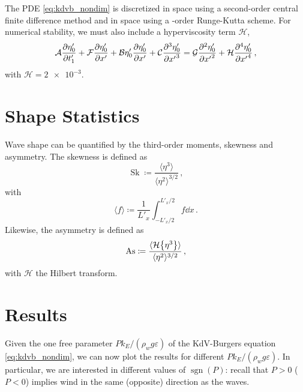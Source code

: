 \documentclass{jfm}
\DeclareMathOperator{\sgn}{sgn}
\DeclareMathOperator{\Sk}{Sk}
\DeclareMathOperator{\As}{As}
\newcommand{\hilbert}{\mathcal{H}}
\renewcommand*{\epsilon}{\varepsilon}
\begin{document}
The PDE \cref{eq:kdvb_nondim} is discretized in space using a
second-order central finite difference method and in space using a
-order Runge-Kutta scheme.
For numerical stability, we must also include a hyperviscosity term
$\mathcal{H}$,
\begin{equation}
  \mathcal{A} \pdv{\eta'_0}{t'_1} + \mathcal{F} \pdv{\eta'_0}{x'} + \mathcal{B}
  \eta'_0 \pdv{\eta'_0}{x'} + \mathcal{C} \pdv[3]{\eta'_0}{{x'}} =
  \mathcal{G} \pdv[2]{\eta'_0}{{x'}} + \mathcal{H}
  \pdv[4]{\eta'_0}{{x'}} \,,
\end{equation}
with $\mathcal{H} = \num{2e-3}$.

\section{Shape Statistics}
Wave shape can be quantified by the third-order moments, skewness and
asymmetry.
The skewness is defined as
\begin{equation}
  \Sk \coloneqq \frac{\langle \eta^3 \rangle}{\langle \eta^2
  \rangle^{3/2}} \,,
\end{equation}
with
\begin{equation}
  \langle f \rangle \coloneqq \frac{1}{L'_x} \int_{-L'_x/2}^{L'_x/2} f
  \dd{x} \,.
\end{equation}
Likewise, the asymmetry is defined as
\begin{equation}
  \As \coloneqq \frac{\langle \hilbert \Bqty{\eta^3} \rangle}{\langle
    \eta^2 \rangle^{3/2}} \,,
\end{equation}
with $\hilbert$ the Hilbert transform.

\section{Results}
Given the one free parameter $P k_E/(\rho_w g \epsilon)$ of the
KdV-Burgers equation \cref{eq:kdvb_nondim}, we can now plot the results
for different $P k_E/(\rho_w g \epsilon)$.
In particular, we are interested in different values of $\sgn(P)$:
recall that $P>0$ ($P<0$) implies wind in the same (opposite) direction
as the waves.
\end{document}
